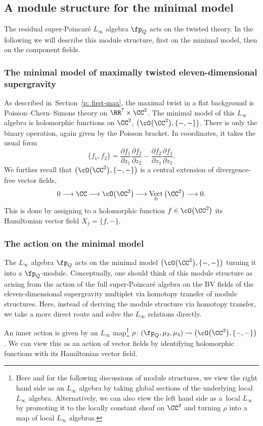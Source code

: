 \documentclass[pdftex]{sigma}
\numberwithin{equation}{section}
\theoremstyle{definition}
\DeclareMathOperator{\Vect}{Vect}
\begin{document}
\subsection{A module structure for the minimal model} \label{sec: max-module}
The residual super-Poincar\'e $L_\infty$ algebra $\fp_Q$ acts on the twisted theory. In the following we will describe this module structure, first on the minimal model, then on the component fields.

\subsubsection{The minimal model of maximally twisted eleven-dimensional supergravity}
As described in~Section~\ref{p: first-max}, the maximal twist in a flat background is Poisson--Chern--Simons theory on $\RR^7 \times \CC^2$. The minimal model of this $L_\infty$ algebra is holomorphic functions on $\CC^2$,
$ \big( \cO\big(\CC^2\big), \{-,-\} \big)$.
There is only the binary operation, again given by the Poisson bracket. In coordinates, it takes the usual form
\[
 \{f_1, f_2\} = \frac{\partial f_1}{\partial z_1} \frac{\partial f_2}{\partial z_2} - \frac{\partial f_2}{\partial z_1} \frac{\partial f_1}{\partial z_2} .
\]
We further recall that $\bigl(\cO\big(\CC^2\big), \{- , -\}\bigr)$ is a central extension of divergence-free vector fields,
\[
 0 \longrightarrow \CC \longrightarrow \cO\big(\CC^2\big) \longrightarrow \Vect_0\big(\CC^2\big) \longrightarrow 0 .
\]
This is done by assigning to a holomorphic function $f \in \cO\big(\CC^2\big)$ its Hamiltonian vector field $X_f = \{f,-\}$.

\subsubsection{The action on the minimal model}
The $L_\infty$ algebra $\fp_Q$ acts on the minimal model $\big(\cO\big(\CC^2\big) , \{-,-\}\big)$ turning it into a $\fp_Q$-module. Conceptually, one should think of this module structure as arising from the action of the full super-Poincar\'e algebra on the BV fields of the eleven-dimensional supergravity multiplet via homotopy transfer of module structures. Here, instead of deriving the module structure via homotopy transfer, we take a more direct route and solve the $L_\infty$ relations directly.

An inner action is given by an $L_\infty$ map\footnote{Here and for the following discussions of module structures, we view the right hand side as an $L_\infty$ algebra by taking global sections of the underlying local $L_\infty$ algebra. Alternatively, we can also view the left hand side as a~local $L_\infty$ by promoting it to the locally constant sheaf on $\CC^2$ and turning $\rho$ into a map of local $L_\infty$ algebras.}
$
 \rho\colon (\fp_Q , \mu_2, \mu_4) \rightsquigarrow \big(\cO\big(\CC^2\big) , \{-,-\}\big)$.
We can view this as an action of vector fields by identifying holomorphic functions with its Hamiltonian vector field.
\end{document}
